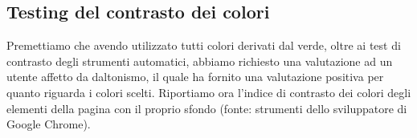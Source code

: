 \subsection{Testing del contrasto dei colori}
Premettiamo che avendo utilizzato tutti colori derivati dal verde, oltre ai test di contrasto degli strumenti automatici, abbiamo richiesto una valutazione ad un utente affetto da daltonismo, il quale ha fornito una valutazione positiva per quanto riguarda i colori scelti.
Riportiamo ora l'indice di contrasto dei colori degli elementi della pagina con il proprio sfondo (fonte: strumenti dello sviluppatore di Google Chrome).
